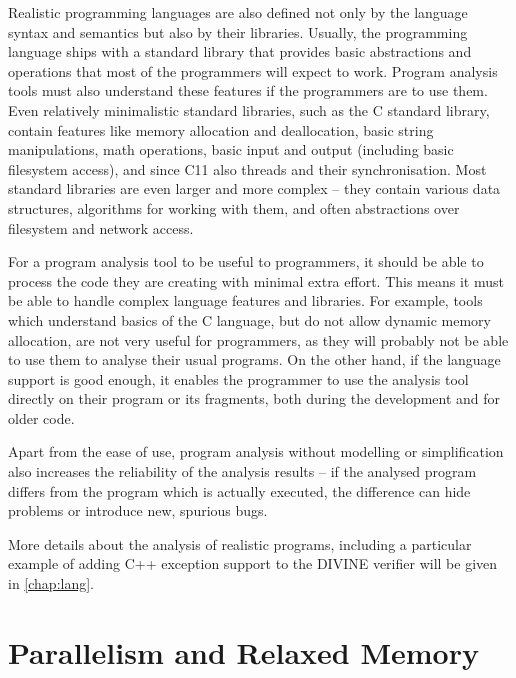 Realistic programming languages are also defined not only by the language syntax and semantics but also by their libraries.
Usually, the programming language ships with a standard library that provides basic abstractions and operations that most of the programmers will expect to work.
Program analysis tools must also understand these features if the programmers are to use them.
Even relatively minimalistic standard libraries, such as the C standard library, contain features like memory allocation and deallocation, basic string manipulations, math operations, basic input and output (including basic filesystem access), and since C11 also threads and their synchronisation.
Most standard libraries are even larger and more complex -- they contain various data structures, algorithms for working with them, and often abstractions over filesystem and network access.

For a program analysis tool to be useful to programmers, it should be able to process the code they are creating with minimal extra effort.
This means it must be able to handle complex language features and libraries.
For example, tools which understand basics of the C language, but do not allow dynamic memory allocation, are not very useful for programmers, as they will probably not be able to use them to analyse their usual programs.
On the other hand, if the language support is good enough, it enables the programmer to use the analysis tool directly on their program or its fragments, both during the development and for older code.

Apart from the ease of use, program analysis without modelling or simplification also increases the reliability of the analysis results --
if the analysed program differs from the program which is actually executed, the difference can hide problems or introduce new, spurious bugs.

More details about the analysis of realistic programs, including a particular
example of adding C++ exception support to the DIVINE verifier will be given in
\autoref{chap:lang}.

\section{Parallelism and Relaxed Memory}

